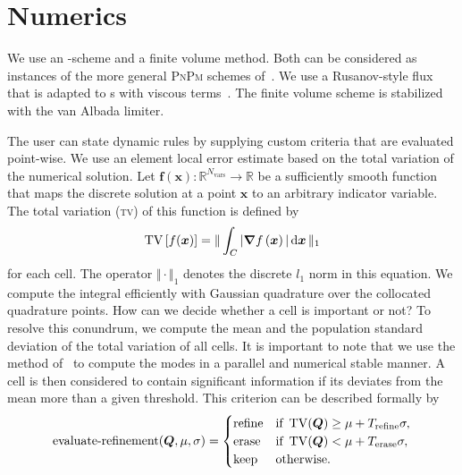\documentclass[runningheads]{llncs}
\begin{document}
\section{Numerics}

We use an \aderdg{}-scheme and a \muscl{} finite volume method.
Both can be considered as instances of the more general \textsc{PnPm} schemes of~\cite{dumbser2008unified}.
We use a Rusanov-style flux that is adapted to \pde{}s with viscous terms~\cite{gassner2008discontinuous,fambri2017space}.
The finite volume scheme is stabilized with the van Albada limiter.

The user can state dynamic \amr{} rules by supplying custom criteria that are evaluated point-wise.
We use an element local error estimate based on the total variation of the numerical solution. 
Let $\bm{f}(\bm{x}): \mathbb{R}^{N_\text{vars}} \to \mathbb{R}$ be a sufficiently smooth function that maps the discrete solution at a point $\bm{x}$ to an arbitrary indicator variable.
The total variation (\textsc{tv}) of this function is defined by
\begin{equation}
  \label{eq:tv}
  \tv \left[ f(\bm{x}) \right] =
  \Vert
\intdcell{ \vert \gradient{f \left( \bm{x} \right)} \vert }
\Vert_1
\end{equation}
for each cell.
The operator $\Vert \cdot \Vert_1$ denotes the discrete $l_1$ norm in this equation.
We compute the integral efficiently with Gaussian quadrature over the collocated quadrature points.
\newcommand{\mean}{\mu}%
\newcommand{\std}{\sigma}%
\newcommand{\variance}{\std^2}%
\newcommand{\Trefine}{T_\text{refine}}%
\newcommand{\Tdelete}{T_\text{erase}}%
How can we decide whether a cell is important or not?
To resolve this conundrum, we compute the mean and the population standard deviation of the total variation of all cells.
It is important to note that we use the method of~\cite{chan1982updating} to compute the modes in a parallel and numerical stable manner.
A cell is then considered to contain significant information if its deviates from the mean more than a given threshold.
This criterion can be described formally by
\begin{equation}
  \label{eq:refinement-criterion}
  \operatorname{evaluate-refinement}(\Q, \mu, \sigma) =
  \begin{cases}
    \text{refine} & \text{if } \tv(\Q) \geq \mu + \Trefine \sigma, \\
    \text{erase} & \text{if } \tv(\Q) < \mu + \Tdelete \sigma, \\
    \text{keep} & \text{otherwise}.
    \end{cases}
\end{equation}
\end{document}
